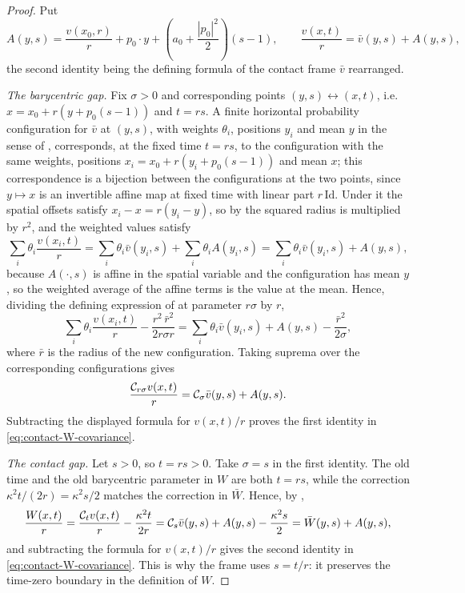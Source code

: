 \begin{proof}
Put
\[
  A(y,s)=\frac{v(x_0,r)}{r}+p_0\cdot y
             +\left(a_0+\frac{|p_0|^2}{2}\right)(s-1),
  \qquad \frac{v(x,t)}{r}=\bar v(y,s)+A(y,s),
\]
the second identity being the defining formula of the contact frame $\bar v$
rearranged.

\emph{The barycentric gap.} Fix $\sigma>0$ and corresponding points $(y,s)\leftrightarrow(x,t)$, i.e.
$x=x_0+r(y+p_0(s-1))$ and $t=rs$. A finite horizontal probability
configuration for $\bar v$ at $(y,s)$, with weights $\theta_i$, positions $y_i$
and mean $y$ in the sense of , corresponds, at the fixed time $t=rs$, to the configuration with the
same weights, positions $x_i=x_0+r(y_i+p_0(s-1))$ and mean $x$; this
correspondence is a bijection between the configurations at the two points,
since $y\mapsto x$ is an invertible affine map at fixed time with linear part
$r\,\mathrm{Id}$. Under it the spatial offsets satisfy $x_i-x=r(y_i-y)$, so by
 the squared radius is multiplied by $r^2$, and the weighted
values satisfy
\[
  \sum_i\theta_i\frac{v(x_i,t)}{r}
    =\sum_i\theta_i\bar v(y_i,s)+\sum_i\theta_iA(y_i,s)
    =\sum_i\theta_i\bar v(y_i,s)+A(y,s),
\]
because $A(\cdot,s)$ is affine in the spatial variable and the configuration has
mean $y$, so the weighted average of the affine terms is the value at the mean.
Hence, dividing the defining expression of  at parameter
$r\sigma$ by $r$,
\[
  \sum_i\theta_i\frac{v(x_i,t)}{r}-\frac{r^2\,\bar r^2}{2r\sigma r}
   =\sum_i\theta_i\bar v(y_i,s)+A(y,s)-\frac{\bar r^2}{2\sigma},
\]
where $\bar r$ is the radius of the new configuration. Taking suprema over the
corresponding configurations gives
\[
  \frac{\mathcal{C}_{r\sigma}v(x,t)}{r}=\mathcal{C}_\sigma\bar v(y,s)+A(y,s).
\]
Subtracting the displayed formula for $v(x,t)/r$ proves the first identity in
\eqref{eq:contact-W-covariance}.

\emph{The contact gap.} Let $s>0$, so $t=rs>0$. Take $\sigma=s$ in the first
identity. The old time and the old barycentric parameter in $W$ are both
$t=rs$, while the correction $\kappa^2t/(2r)=\kappa^2s/2$ matches the correction
in $\bar W$. Hence, by ,
\[
  \frac{W(x,t)}{r}=\frac{\mathcal{C}_tv(x,t)}{r}-\frac{\kappa^2t}{2r}
   =\mathcal{C}_s\bar v(y,s)+A(y,s)-\frac{\kappa^2s}{2}
   =\bar W(y,s)+A(y,s),
\]
and subtracting the formula for $v(x,t)/r$ gives the second identity in
\eqref{eq:contact-W-covariance}. This is why the frame uses $s=t/r$: it
preserves the time-zero boundary in the definition of $W$.
\end{proof}
